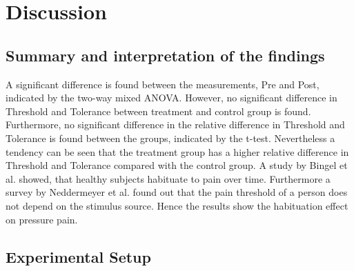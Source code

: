 \section{Discussion}

\subsection{Summary and interpretation of the findings}

A significant difference is found between the measurements, Pre and Post, indicated by the two-way mixed ANOVA. However, no significant
difference in Threshold and Tolerance between treatment and control group is found. Furthermore, no significant difference in the relative difference in Threshold and Tolerance is found between the groups, indicated by the t-test. Nevertheless a tendency can be seen that the treatment group has a higher relative difference in Threshold and Tolerance compared with the control group. A study by Bingel et al. \cite{Bingel2007} showed, that healthy subjects habituate to pain over time.  Furthermore a survey by Neddermeyer et al. \cite{Neddermeyer2007} found out that the pain threshold of a person does not depend on the stimulus source. Hence the results show the habituation effect on pressure pain.

\subsection{Experimental Setup}

